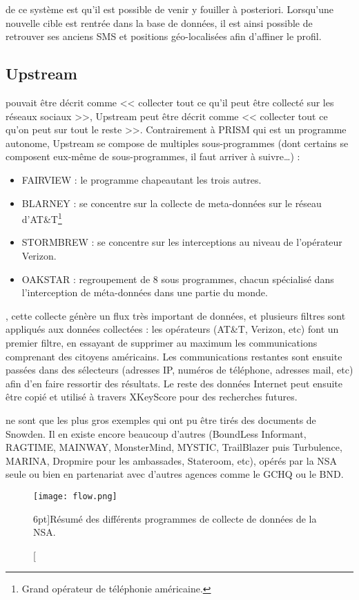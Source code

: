  de ce système est qu'il est possible de venir y
fouiller à posteriori. Lorsqu'une nouvelle cible est rentrée dans la base de
données, il est ainsi possible de retrouver ses anciens SMS et positions
géo-localisées afin d'affiner le profil.

\subsection{Upstream}

 pouvait être décrit comme << collecter tout ce qu'il
peut être collecté sur les réseaux sociaux >>, Upstream peut être décrit comme
<< collecter tout ce qu'on peut sur tout le reste >>. Contrairement à PRISM qui
est un programme autonome, Upstream se compose de multiples sous-programmes
(dont certains se composent eux-même de sous-programmes, il faut arriver à
suivre\ldots) :

\begin{itemize}
  \item FAIRVIEW : le programme chapeautant les trois autres.
  \item BLARNEY : se concentre sur la collecte de meta-données sur le réseau
  d'AT\&T\footnote{Grand opérateur de téléphonie américaine.}
  \item STORMBREW : se concentre sur les interceptions au niveau de l'opérateur
  Verizon.
  \item OAKSTAR : regroupement de 8 sous programmes, chacun spécialisé dans
  l'interception de méta-données dans une partie du monde.
\end{itemize}

, cette collecte génère un flux très important
de données, et plusieurs filtres sont appliqués aux données collectées : les
opérateurs (AT\&T, Verizon, etc) font un premier filtre, en essayant de
supprimer au maximum les communications comprenant des citoyens américains.
Les communications restantes sont ensuite passées dans des sélecteurs (adresses
IP, numéros de téléphone, adresses mail, etc) afin d'en faire ressortir des
résultats. Le reste des données Internet peut ensuite être copié et utilisé à
travers XKeyScore pour des recherches futures.


 ne sont que les plus gros exemples qui ont pu
être tirés des documents de Snowden. Il en existe encore beaucoup d'autres
(BoundLess Informant, RAGTIME, MAINWAY, MonsterMind, MYSTIC, TrailBlazer puis
Turbulence, MARINA, Dropmire pour les ambassades, Stateroom, etc), opérés par
la NSA seule ou bien en partenariat avec d'autres agences comme le GCHQ ou le
BND.

\vspace{0.8cm}
\begin{figure}
\texttt{[image: flow.png]}
\caption[Infographie résumant les différents programmes de
surveillance américains][6pt]{Résumé des différents programmes de collecte de
données de la NSA.}
\label{fig:infographie}
\end{figure}